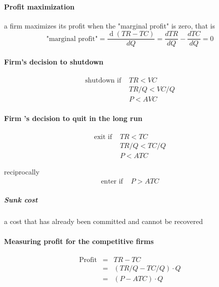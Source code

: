 \documentclass[a4paper,titlepage] {scrartcl}
\begin{document}


\paragraph{Profit maximization} %
\label{par:profit_maximization}
a firm maximizes its profit when the "marginal profit" is zero, that is
\begin{equation}
	\text{"marginal profit"}
	=\frac{\operatorname{d}(TR-TC)}{dQ}
	=\frac{dTR}{dQ}-\frac{dTC}{dQ}=0
\end{equation}

\paragraph{Firm's decision to shutdown} %
\label{par:firm_s_decision_to_shutdown}
\begin{eqnarray*}
	\text{shutdown if }&
	TR < VC\nonumber\\
&	TR/Q < VC/Q\nonumber\\
	&P < AVC
\end{eqnarray*}

\paragraph{Firm 's decision  to quit in the long run} %
\label{par:firm_s_decision_to_quit_in_the_long_run}
\begin{eqnarray*}
		\text{exit if }&
		TR < TC\nonumber\\
	&	TR/Q < TC/Q\nonumber\\
		&P < ATC
\end{eqnarray*}

reciprocally	
\begin{eqnarray*}
		\text{enter if }
		&P > ATC
\end{eqnarray*}


\subparagraph{Sunk cost} %
\label{subp:sunk_cost}

a cost that has already been committed and cannot be recovered

\paragraph{Measuring profit for the competitive firms} %
\label{par:measuring_profit_for_the_competitive_firms}
\begin{eqnarray*}
	\text{Profit} &=& TR -TC\nonumber\\
	&=& (TR/Q -TC/Q)\cdot Q\nonumber\\
	&=& (P-ATC)\cdot Q
\end{eqnarray*}
\end{document}
